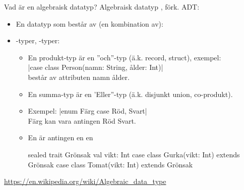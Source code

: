 
\begin{Slide}{Vad är en algebraisk datatyp?}%
Algebraisk datatyp , förk. ADT:
\begin{itemize}%
\item En datatyp som består av (en kombination av): 
\item {}-typer, -typer:
\begin{itemize}%
\item En produkt-typ är en ''och''-typ (ä.k. record, struct), exempel: \\ \code|case class Person(namn: String, ålder: Int)| \\består av attributen namn  ålder.
\item En summa-typ  är en 'Eller''-typ (ä.k. disjunkt union, co-produkt).
\item Exempel: \code|enum Färg { case Röd, Svart}| \\Färg kan vara antingen Röd  Svart.
\item[] En  är antingen en   en 
\begin{Code}
sealed trait Grönsak { val vikt: Int }
case class Gurka(vikt: Int) extends Grönsak
case class Tomat(vikt: Int) extends Grönsak
\end{Code}
\end{itemize}  
\end{itemize} 
{\vspace{0.5em}\SlideFontTiny \url{https://en.wikipedia.org/wiki/Algebraic_data_type}}
\end{Slide}

